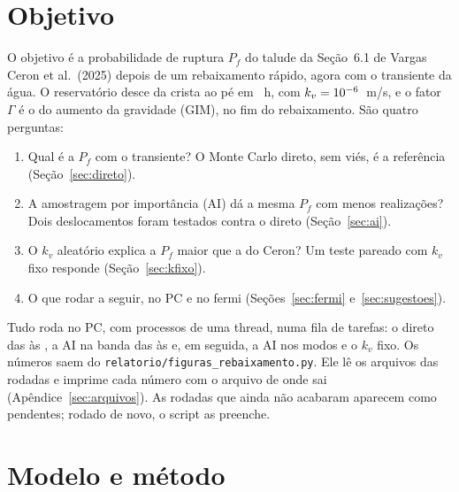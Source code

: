 \documentclass[11pt,a4paper]{article}
\begin{document}
\section{Objetivo}\label{sec:objetivo}
O objetivo é a probabilidade de ruptura $P_f$ do talude da Seção~6.1 de Vargas Ceron et al.\ (2025) depois de um
rebaixamento rápido, agora com o transiente da água. O reservatório desce da crista ao pé em \Trebaix~h, com
$k_v = 10^{-6}$~m/s, e o fator $\Gamma$ é o do aumento da gravidade (GIM), no fim do rebaixamento. São quatro perguntas:
\begin{enumerate}
\item Qual é a $P_f$ com o transiente? O Monte Carlo direto, sem viés, é a referência (Seção~\ref{sec:direto}).
\item A amostragem por importância (AI) dá a mesma $P_f$ com menos realizações? Dois deslocamentos foram testados
contra o direto (Seção~\ref{sec:ai}).
\item O $k_v$ aleatório explica a $P_f$ maior que a do Ceron? Um teste pareado com $k_v$ fixo responde
(Seção~\ref{sec:kfixo}).
\item O que rodar a seguir, no PC e no fermi (Seções~\ref{sec:fermi} e~\ref{sec:sugestoes}).
\end{enumerate}
Tudo roda no PC, com \ProcPC{} processos de uma thread, numa fila de tarefas: o direto das \InicioDireto{} às
\FimDireto, a AI na banda das \InicioBanda{} às \FimBanda{} e, em seguida, a AI nos modos e o $k_v$ fixo. Os números
saem do \texttt{relatorio/figuras\_rebaixamento.py}. Ele lê os arquivos das rodadas e imprime cada número com o arquivo
de onde sai (Apêndice~\ref{sec:arquivos}). As rodadas que ainda não acabaram aparecem como pendentes; rodado de novo,
o script as preenche.

\section{Modelo e método}\label{sec:modelo}
\end{document}
